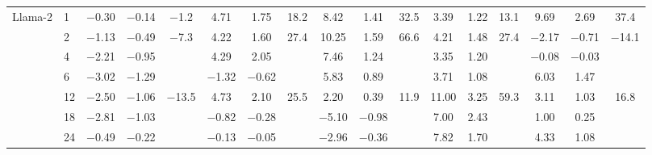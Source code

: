 \begin{table}[htbp]
{\begin{adjustbox}{max width=\linewidth, max totalheight=0.20\textheight}
\begin{tabular}{llccccccccccccccc}
\midrule
Llama-2 & 1 & $-$0.30 & $-$0.14 & \phantom{0}$-$1.2 & \phantom{$-$}4.71 & \phantom{$-$}1.75 & 18.2 & \phantom{$-$0}8.42 & \phantom{$-$}1.41 & 32.5 & \phantom{0}3.39 & 1.22 & 13.1 & \phantom{$-$}9.69 & \phantom{$-$}2.69 & \phantom{$-$}37.4 \\
 & 2 & $-$1.13 & $-$0.49 & \phantom{0}$-$7.3 & \phantom{$-$}4.22 & \phantom{$-$}1.60 & 27.4 & \phantom{$-$}10.25 & \phantom{$-$}1.59 & 66.6 & \phantom{0}4.21 & 1.48 & 27.4 & $-$2.17 & $-$0.71 & $-$14.1 \\
 & 4 & $-$2.21 & $-$0.95 &  & \phantom{$-$}4.29 & \phantom{$-$}2.05 &  & \phantom{$-$0}7.46 & \phantom{$-$}1.24 &  & \phantom{0}3.35 & 1.20 &  & $-$0.08 & $-$0.03 &  \\
 & 6 & $-$3.02 & $-$1.29 &  & $-$1.32 & $-$0.62 &  & \phantom{$-$0}5.83 & \phantom{$-$}0.89 &  & \phantom{0}3.71 & 1.08 &  & \phantom{$-$}6.03 & \phantom{$-$}1.47 &  \\
 & 12 & $-$2.50 & $-$1.06 & $-$13.5 & \phantom{$-$}4.73 & \phantom{$-$}2.10 & 25.5 & \phantom{$-$0}2.20 & \phantom{$-$}0.39 & 11.9 & 11.00 & 3.25 & 59.3 & \phantom{$-$}3.11 & \phantom{$-$}1.03 & \phantom{$-$}16.8 \\
 & 18 & $-$2.81 & $-$1.03 &  & $-$0.82 & $-$0.28 &  & \phantom{0}$-$5.10 & $-$0.98 &  & \phantom{0}7.00 & 2.43 &  & \phantom{$-$}1.00 & \phantom{$-$}0.25 &  \\
 & 24 & $-$0.49 & $-$0.22 &  & $-$0.13 & $-$0.05 &  & \phantom{0}$-$2.96 & $-$0.36 &  & \phantom{0}7.82 & 1.70 &  & \phantom{$-$}4.33 & \phantom{$-$}1.08 &  \\
\bottomrule
\end{tabular}
\end{adjustbox}
}
\end{table}
